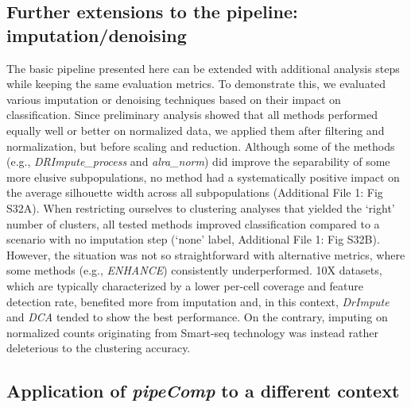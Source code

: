 \documentclass{bmcart}
\begin{document}
\subsection*{Further extensions to the pipeline: imputation/denoising}

The basic pipeline presented here can be extended with additional analysis steps while keeping the same evaluation metrics. To demonstrate this, we evaluated various imputation or denoising techniques based on their impact on classification. Since preliminary analysis showed that all methods performed equally well or better on normalized data, we applied them after filtering and normalization, but before scaling and reduction. Although some of the methods (e.g., \textit{DRImpute\_process} and \textit{alra\_norm}) did improve the separability of some more elusive subpopulations, no method had a systematically positive impact on the average silhouette width across all subpopulations (Additional File 1: Fig S32A). When restricting ourselves to clustering analyses that yielded the `right' number of clusters, all tested methods improved classification  compared to a scenario with no imputation step (`none' label, Additional File 1: Fig S32B). However, the situation was not so straightforward with alternative metrics, where some methods (e.g., \textit{ENHANCE}) consistently underperformed. 10X datasets, which are typically characterized by a lower per-cell coverage and feature detection rate, benefited more from imputation and, in this context, \textit{DrImpute} and \textit{DCA} tended to show the best performance. On the contrary, imputing on normalized counts originating from Smart-seq technology was instead rather deleterious to the clustering accuracy. 

\subsection*{Application of \textit{pipeComp} to a different context}
\end{document}

